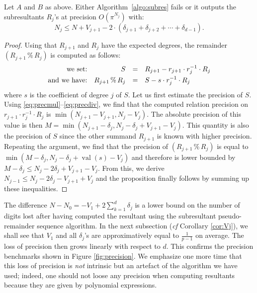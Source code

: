 \documentclass{article}
\DeclareMathOperator{\val}{val}
\begin{document}
\begin{prop}
\label{prop:precEuclide}
Let $A$ and $B$ as above. Either Algorithm~\ref{algo:subres} fails or
it outputs the subresultants $R_j$'s at precision $O(\pi^{N_j})$ with:
$$N_j \leq N + V_{j+1} - 2 \cdot (\delta_{j+1} + \delta_{j+2} + \cdots
+ \delta_{d-1}).$$
\end{prop}

\begin{proof}
Using that $R_{j+1}$ and $R_j$ have the expected degrees, the
remainder $(R_{j+1} \,\%\, R_j)$ is computed as follows:
$$\begin{array}{rrcl}
\text{we set:} & S & = & R_{j+1} - r_{j+1} \cdot r_j^{-1} \cdot R_j \smallskip \\
\text{and we have:} & R_{j+1} \,\%\, R_j & = & S - s \cdot r_j^{-1} \cdot R_j
\end{array}$$
where $s$ is the coefficient of degree $j$ of $S$. Let us first estimate 
the precision of $S$. Using \eqref{eq:precmul}--\eqref{eq:precdiv}, we 
find that the computed relation precision on $r_{j+1} \cdot r_j^{-1} 
\cdot R_j$ is $\min(N_{j+1} - V_{j+1}, N_j - V_j)$. The absolute
precision of this value is then
$M = \min(N_{j+1} - \delta_j, N_j - \delta_j + V_{j+1} - V_j)$. This
quantity is also the precision of $S$ since the other summand
$R_{j+1}$ is known with higher precision. Repeating the argument, we
find that the precision of $(R_{j+1} \,\%\, R_j)$ is equal to 
$\min(M - \delta_j, N_j - \delta_j + \val(s) - V_j)$ and therefore is 
lower bounded by $M - \delta_j \leq N_j - 2 \delta_j + V_{j+1} - V_j$.
From this, we derive $N_{j-1} \leq N_j - 2 \delta_j - V_{j+1} + V_j$ and
the proposition finally follows by summing up these inequalities.
\end{proof}

The difference 
$N - N_0 = - V_1 + 2 \sum_{k=1}^d \delta_j$
is a lower bound on the number of digits lost after having computed the 
resultant using the subresultant pseudo-remainder sequence algorithm. In 
the next subsection (\emph{cf} Corollary \ref{cor:Vj}), we shall see that 
$V_1$ and all $\delta_j$'s are 
approximatively equal to $\frac 1 {p-1}$ on average. The loss of 
precision then grows linearly with respect to $d$. This confirms the 
precision benchmarks shown in Figure \ref{fig:precision}.
We emphasize one more time that this loss of precision is \emph{not}
intrinsic but an artefact of the algorithm we have used; indeed, one
should not loose any precision when computing resultants because they
are given by polynomial expressions.
\end{document}
